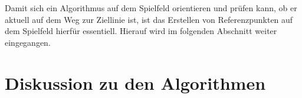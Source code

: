 \documentclass[12pt,a4paper,bibliography=totocnumbered,listof=totocnumbered]{article}
\begin{document}


Damit sich ein Algorithmus auf dem Spielfeld orientieren und prüfen kann, ob er aktuell auf dem Weg zur Ziellinie ist, ist das Erstellen von Referenzpunkten auf dem Spielfeld hierfür essentiell. Hierauf wird im folgenden Abschnitt weiter eingegangen.








\section{Diskussion zu den Algorithmen}


\pagebreak



\pagebreak




\pagebreak




\pagebreak


  


\lhead{} 
\end{document}
